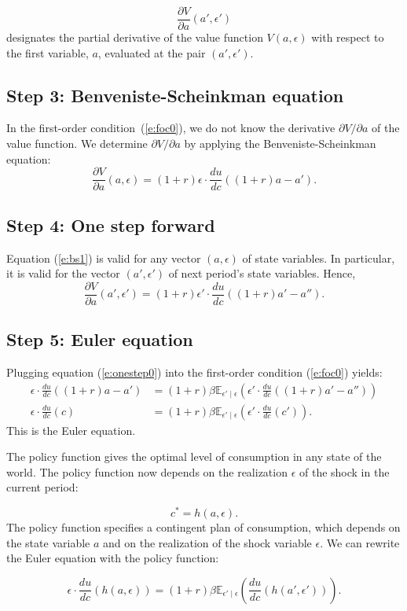 \documentclass{article}
\begin{document}
\[
\frac{\partial V}{\partial a}(a',\epsilon')
\]
designates the partial derivative of the value function $V(a,\epsilon)$ with respect to the first variable, $a$, evaluated at the pair $(a',\epsilon')$.

\subsection{Step 3: Benveniste-Scheinkman equation}

In the first-order condition~(\ref{e:foc0}), we do not know the derivative $\partial V/\partial a$ of the value function. We determine $\partial V/\partial a$ by applying the Benveniste-Scheinkman equation:
\wcSpan*[id=equation-20]{}
\setcounter{tpequation}{19}\label{e:bs1}
\[
\frac{\partial V}{\partial a}(a,\epsilon)= (1+r) \epsilon \cdot \frac{d u}{d c}((1+r) a-a').\tag{20}
\]
\subsection{Step 4: One step forward}
Equation (\ref{e:bs1}) is valid for any vector $(a,\epsilon)$ of state variables. In particular, it is valid for the vector $(a',\epsilon')$ of next period's state variables. Hence,
\wcSpan*[id=equation-21]{}
\setcounter{tpequation}{20}\label{e:onestep0}
\[
\frac{\partial V}{\partial a}(a',\epsilon')= (1+r) \epsilon'\cdot \frac{d u}{d c}((1+r) a'-a'').\tag{21}
\]

\subsection{Step 5: Euler equation}

Plugging equation (\ref{e:onestep0}) into the first-order condition (\ref{e:foc0}) yields:
\wcSpan*[id=equation-22]{}
\setcounter{tpequation}{21}\label{e:eulerstoc}
\[
\begin{align*}
\epsilon \cdot \frac{d u}{d c}((1+r) a-a')&=(1+r) \beta \mathbb{E}_{\epsilon'\mid \epsilon}\left(\epsilon' \cdot \frac{d u}{d c}((1+r) a'-a'')\right)\\
\epsilon \cdot \frac{d u}{d c}(c)&=(1+r) \beta \mathbb{E}_{\epsilon'\mid \epsilon}\left(\epsilon' \cdot \frac{d u}{d c}(c')\right).\tag{22}
\end{align*}
\]
This is the Euler equation.

The policy function gives the optimal level of consumption in any state of the world. The policy function now depends on the realization $\epsilon$ of the shock in the current period:


\[
c^{*}=h(a,\epsilon).
\]
The policy function specifies a contingent plan of consumption, which depends on the state variable $a$ and on the realization of the shock variable $\epsilon$. We can rewrite the Euler equation with the policy function:

\[
\epsilon \cdot \frac{d u}{d c}(h(a,\epsilon))=(1+r) \beta \mathbb{E}_{\epsilon' \mid \epsilon}\left(\frac{d u}{d c}(h(a',\epsilon'))\right).
\]
\end{document}
